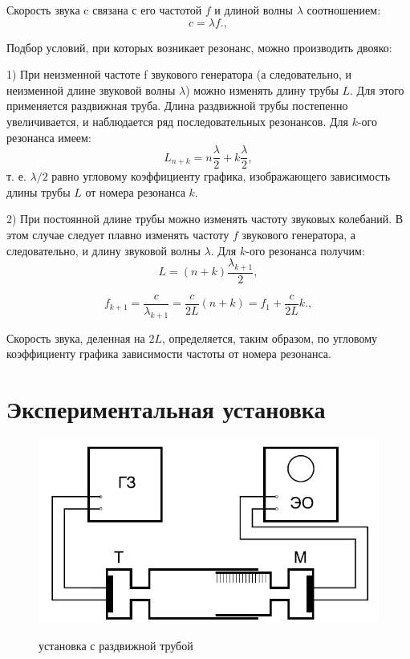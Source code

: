 \documentclass[12pt,a4paper]{article}
\begin{document}
Скорость звука c связана с его частотой $f$ и длиной волны $\lambda$ соотношением:
\begin{equation}
	c=\lambda f.,
\end{equation}


Подбор условий, при которых возникает резонанс, можно производить двояко:

1) При неизменной частоте f звукового генератора (а следовательно, и неизменной длине звуковой волны $\lambda$) можно изменять длину трубы $L$.
Для этого применяется раздвижная труба.
Длина раздвижной трубы постепенно увеличивается, и наблюдается ряд последовательных резонансов.
Для $k$-ого резонанса имеем:
\begin{equation}
	L_{n+k}=n\frac{\lambda}{2} + k\frac{\lambda}{2},
\end{equation}
т. е. $\lambda/2$ равно угловому коэффициенту графика, изображающего зависимость длины трубы $L$ от номера резонанса $k$.

2) При постоянной длине трубы можно изменять частоту звуковых
колебаний.
В этом случае следует плавно изменять частоту $f$ звукового генератора, а следовательно, и длину звуковой волны $\lambda$.
Для $k$-ого резонанса получим:
\begin{equation}
	L = (n+k)\frac{\lambda_{k+1}}{2},
\end{equation}

\begin{equation}
	f_{k+1} = \frac{c}{\lambda_{k+1}}=\frac{c}{2L}(n+k)=f_1 + \frac{c}{2L}k.,
\end{equation}

Скорость звука, деленная на $2L$, определяется, таким образом, по угловому коэффициенту графика зависимости частоты от номера резонанса.
		


	\section*{Экспериментальная установка}
	
	\begin{figure}[h]
		\caption{установка с раздвижной трубой}
		\includegraphics[scale=0.65]{res/scheme1.jpg}
		\label{scheme1}
	\end{figure}
\end{document}
